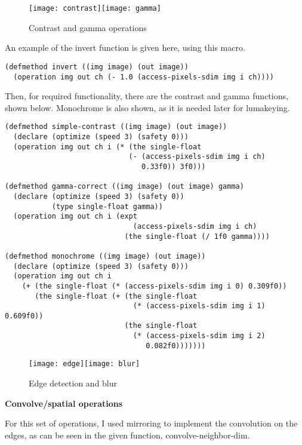 \documentclass[11pt]{report}
\begin{document}
\begin{figure}[h!]
\centering
    \texttt{[image: contrast]}\texttt{[image: gamma]}
\caption{Contrast and gamma operations}
\end{figure}

An example of the invert function is given here, using this macro.

\begin{lstlisting}
(defmethod invert ((img image) (out image))
  (operation img out ch (- 1.0 (access-pixels-sdim img i ch))))
\end{lstlisting}

Then, for required functionality, there are the contrast and gamma functions,
shown below. Monochrome is also shown, as it is needed later for lumakeying.

\begin{lstlisting}
(defmethod simple-contrast ((img image) (out image))
  (declare (optimize (speed 3) (safety 0)))
  (operation img out ch i (* (the single-float
                             (- (access-pixels-sdim img i ch)
                                0.33f0)) 3f0)))

(defmethod gamma-correct ((img image) (out image) gamma)
  (declare (optimize (speed 3) (safety 0))
           (type single-float gamma))
  (operation img out ch i (expt
                              (access-pixels-sdim img i ch)
                            (the single-float (/ 1f0 gamma))))

(defmethod monochrome ((img image) (out image))
  (declare (optimize (speed 3) (safety 0)))
  (operation img out ch i
    (+ (the single-float (* (access-pixels-sdim img i 0) 0.309f0))
       (the single-float (+ (the single-float
                              (* (access-pixels-sdim img i 1) 0.609f0))
                            (the single-float
                              (* (access-pixels-sdim img i 2)
                                 0.082f0)))))))
\end{lstlisting}

\begin{figure}[h!]
\centering
    \texttt{[image: edge]}\texttt{[image: blur]}
\caption{Edge detection and blur}
\end{figure}

\bigskip
\textbf{Convolve/spatial operations}

For this set of operations, I used mirroring to implement the convolution
on the edges, as can be seen in the given function, convolve-neighbor-dim.
\end{document}
